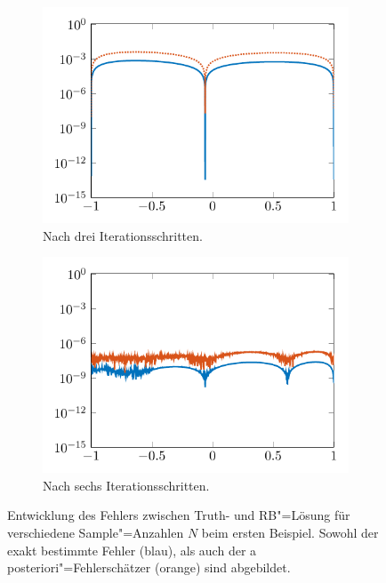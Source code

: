\documentclass[../main.tex]{subfiles}
\begin{document}
\begin{figure}[tb]
\begin{subfigure}[b]{0.495\textwidth}
        \includegraphics[width=1\textwidth]{figures/chapter5/ch5ex1_rbmerr_plot_3.pdf}
        \caption{Nach drei Iterationsschritten.}
    \end{subfigure}
    \begin{subfigure}[b]{0.495\textwidth}
        \centering
        \includegraphics[width=1\textwidth]{figures/chapter5/ch5ex1_rbmerr_plot_6.pdf}
        \caption{Nach sechs Iterationsschritten.}
    \end{subfigure}
    \caption[Entwicklung des Fehlers zwischen Truth- und RB"=Lösung für verschiedene RB"=Dimensionen $N$, erstes Beispiel.]{%
    Entwicklung des Fehlers zwischen Truth- und RB"=Lösung für verschiedene Sample"=Anzahlen $N$ beim ersten Beispiel.
    Sowohl der exakt bestimmte Fehler (blau), als auch der a posteriori"=Fehlerschätzer (orange) sind abgebildet.}
    \label{figure:vergleich_rbm_iterationen}
\end{figure}
\end{document}

